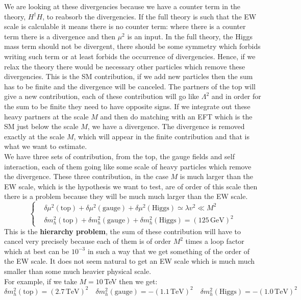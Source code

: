 \documentclass[../main.tex]{subfiles}
\begin{document}
We are looking at these divergencies because we have a counter term in the theory, $H^\dagger H$, to reabsorb the divergencies. If the full theory is such that the EW scale is calculable it means there is no counter term: where there is a counter term there is a divergence and then $\mu^2$ is an input. In the full theory, the Higgs mass term should not be divergent, there should be some symmetry which forbids writing such term or at least forbids the occurrence of divergencies. Hence, if we relax the theory there would be necessary other particles which remove these divergencies. This is the SM contribution, if we add new particles then the sum has to be finite and the divergence will be canceled. The partners of the top will give a new contribution, each of these contribution will go like $\Lambda^2$ and in order for the sum to be finite they need to have opposite signs. If we integrate out these heavy partners at the scale $M$ and then do matching with an EFT which is the SM just below the scale $M$, we have a divergence. The divergence is removed exactly at the scale $M$, which will appear in the finite contribution and that is what we want to estimate.\\
We have three sets of contribution, from the top, the gauge fields and self interaction, each of them going like some scale of heavy particles which remove the divergence. These three contribution, in the case $M$ is much larger than the EW scale, which is the hypothesis we want to test, are of order of this scale then there is a problem because they will be much much larger than the EW scale. 
\[
\left\{
\begin{aligned}
&\delta\mu^2(\text{top})+\delta\mu^2(\text{gauge})+\delta\mu^2(\text{Higgs})\simeq\lambda v^2\ll M^2\\
&\delta m_h^2(\text{top})+\delta m_h^2(\text{gauge})+\delta m_h^2(\text{Higgs})=(125\,\text{GeV})^2
\end{aligned}
\right.
\]
This is the \textbf{hierarchy problem}, the sum of these contribution will have to cancel very precisely because each of them is of order $M^2$ times a loop factor which at best can be $10^{-3}$ in such a way that we get something of the order of the EW scale. It does not seem natural to get an EW scale which is much much smaller than some much heavier physical scale.\\
For example, if we take $M=10$\,TeV then we get:
\[
\delta m_h^2(\text{top})=(2.7\,\text{TeV})^2 \quad \delta m_h^2(\text{gauge})=-(1.1\,\text{TeV})^2 \quad \delta m_h^2(\text{Higgs})=-(1.0\,\text{TeV})^2
\]
\end{document}
